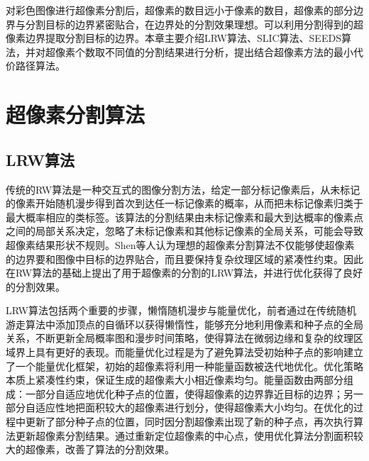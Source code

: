 \documentclass[nomlist,masters]{seuthesix}
\begin{document}

对彩色图像进行超像素分割后，超像素的数目远小于像素的数目，超像素的部分边界与分割目标的边界紧密贴合，在边界处的分割效果理想。可以利用分割得到的超像素边界提取分割目标的边界。本章主要介绍LRW算法、SLIC算法、SEEDS算法，并对超像素个数取不同值的分割结果进行分析，提出结合超像素方法的最小代价路径算法。

\section{超像素分割算法}

\subsection{LRW算法}
传统的RW算法是一种交互式的图像分割方法，给定一部分标记像素后，从未标记的像素开始随机漫步得到首次到达任一标记像素的概率，从而把未标记像素归类于最大概率相应的类标签。该算法的分割结果由未标记像素和最大到达概率的像素点之间的局部关系决定，忽略了未标记像素和其他标记像素的全局关系，可能会导致超像素结果形状不规则。Shen等人认为理想的超像素分割算法不仅能够使超像素的边界要和图像中目标的边界贴合，而且要保持复杂纹理区域的紧凑性约束。因此在RW算法的基础上提出了用于超像素的分割的LRW算法，并进行优化获得了良好的分割效果。

LRW算法\cite{Shen2014Lazy}包括两个重要的步骤，懒惰随机漫步与能量优化，前者通过在传统随机游走算法中添加顶点的自循环以获得懒惰性，能够充分地利用像素和种子点的全局关系，不断更新全局概率图和漫步时间策略，使得算法在微弱边缘和复杂的纹理区域界上具有更好的表现。而能量优化过程是为了避免算法受初始种子点的影响建立了一个能量优化框架，初始的超像素将利用一种能量函数被迭代地优化。优化策略本质上紧凑性约束，保证生成的超像素大小相近像素均匀。能量函数由两部分组成：一部分自适应地优化种子点的位置，使得超像素的边界靠近目标的边界；另一部分自适应性地把面积较大的超像素进行划分，使得超像素大小均匀。在优化的过程中更新了部分种子点的位置，同时因分割超像素出现了新的种子点，再次执行算法更新超像素分割结果。通过重新定位超像素的中心点，使用优化算法分割面积较大的超像素，改善了算法的分割效果。
\end{document}
